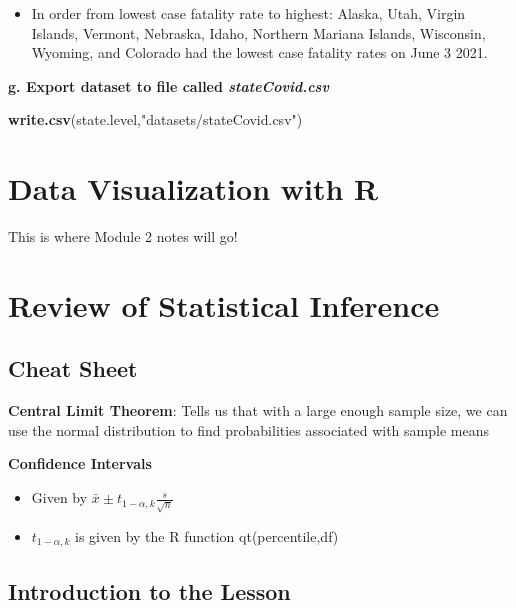 \documentclass[
  openany]{book}
\newenvironment{Shaded}{\begin{snugshade}}{\end{snugshade}}
\newcommand{\FunctionTok}[1]{\textcolor[rgb]{0.13,0.29,0.53}{\textbf{#1}}}
\newcommand{\NormalTok}[1]{#1}
\newcommand{\StringTok}[1]{\textcolor[rgb]{0.31,0.60,0.02}{#1}}
\providecommand{\tightlist}{%
  \setlength{\itemsep}{0pt}\setlength{\parskip}{0pt}}
\begin{document}
\begin{itemize}
\tightlist
\item
  In order from lowest case fatality rate to highest: Alaska, Utah, Virgin Islands, Vermont, Nebraska, Idaho, Northern Mariana Islands, Wisconsin, Wyoming, and Colorado had the lowest case fatality rates on June 3 2021.
\end{itemize}

\textbf{g. Export dataset to file called \emph{stateCovid.csv}}

\begin{Shaded}
\begin{Highlighting}[]
\FunctionTok{write.csv}\NormalTok{(state.level,}\StringTok{"datasets/stateCovid.csv"}\NormalTok{)}
\end{Highlighting}
\end{Shaded}

\chapter{Data Visualization with R}\label{data-visualization-with-r}

This is where Module 2 notes will go!

\appendix


\chapter{Review of Statistical Inference}\label{review-of-statistical-inference}

\section*{Cheat Sheet}\label{cheat-sheet-1}

\textbf{Central Limit Theorem}: Tells us that with a large enough sample size, we can use the normal distribution to find probabilities associated with sample means

\textbf{Confidence Intervals}

\begin{itemize}
\tightlist
\item
  Given by \(\bar{x}\pm t_{1-\alpha,k}\frac{s}{\sqrt{n}}\)
\item
  \(t_{1-\alpha,k}\) is given by the R function qt(percentile,df)
\end{itemize}

\section{Introduction to the Lesson}\label{introduction-to-the-lesson}
\end{document}
